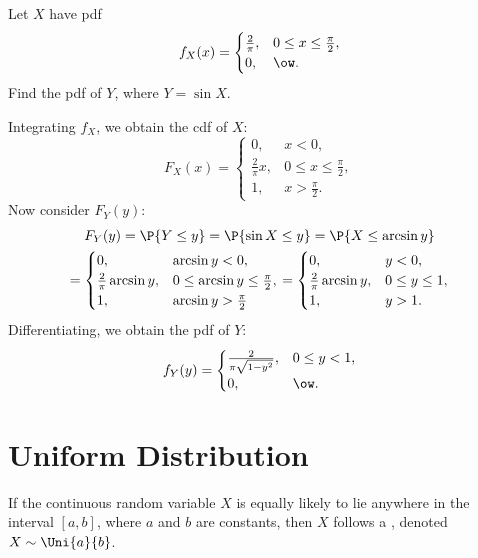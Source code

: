 \begin{sample}
    Let $X$ have pdf \[f_X(x) = \begin{cases}
        \frac2\pi, & 0 \leq x \leq \frac\pi2,\\
        0, & \ow.
    \end{cases}\] Find the pdf of $Y$, where $Y = \sin X$.
\end{sample}
\begin{sampans}
    Integrating $f_X$, we obtain the cdf of $X$: \[F_X(x) = \begin{cases}
        0, & x < 0,\\
        \frac2\pi x, & 0 \leq x \leq \frac\pi2,\\
        1, & x > \frac\pi2.
    \end{cases}\] Now consider $F_Y(y)$:
    \begin{gather*}
        F_Y(y) = \P{Y \leq y} = \P{\sin X \leq y} = \P{X \leq \arcsin y} \\
        = \begin{cases}
            0, & \arcsin y < 0,\\
            \frac2\pi \arcsin y, & 0 \leq \arcsin y \leq \frac\pi2,\\
            1, & \arcsin y > \frac\pi2
        \end{cases} = \begin{cases}
            0, & y < 0,\\
            \frac2\pi \arcsin y, & 0 \leq y \leq 1,\\
            1, & y > 1.
        \end{cases}
    \end{gather*}
    Differentiating, we obtain the pdf of $Y$: \[f_Y(y) = \begin{cases}
        \frac2{\pi\sqrt{1 - y^2}}, & 0 \leq y < 1,\\
        0, & \ow.
    \end{cases}\]
\end{sampans}

\section{Uniform Distribution}

\begin{definition}
    If the continuous random variable $X$ is equally likely to lie anywhere in the interval $[a, b]$, where $a$ and $b$ are constants, then $X$ follows a , denoted $X \sim \Uni{a}{b}$.
\end{definition}

